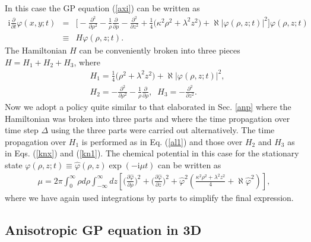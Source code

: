 \documentclass[onecolumn]{elsart3p}
\begin{document}
In this case the GP equation (\ref{axi}) can be written as
\begin{eqnarray}
\mbox{i}
\frac{\partial}{\partial t}\varphi(x,y;t) &  =&
\biggr[
-\frac{\partial^2}{\partial  \rho^2}
-\frac{1}{\rho}\frac{\partial}{\partial  \rho}
-\frac{\partial^2}{\partial  z^2}
+ \frac{1}{4} \biggr( \kappa^2\rho^2 + \lambda^2 z^2   \biggr)
+\aleph  %
|\varphi(\rho,z;t)|^2  \biggr]
\varphi(\rho,z;t) \nonumber \\ & \equiv & H \varphi(\rho,z;t).
\label{ax2}
\end{eqnarray}
The Hamiltonian $H$ can be conveniently broken
into three pieces $H=H_1+H_2+H_3$, where
\begin{align}
& H_1= \frac{1}{4} \biggr(  \rho^2 + \lambda^2 z^2   \biggr)
+\aleph  %
|\varphi(\rho,z;t)|^2,  \\
& H_2=-\frac{\partial^2}{\partial
\rho^2}-\frac{1}{\rho}\frac{\partial}{\partial  \rho}, \;\;
H_3=-\frac{\partial^2}{\partial z^2}. \;\;
\end{align}
Now we adopt a policy quite similar to that elaborated in Sec.
\ref{anp} where the Hamiltonian was broken into three parts and where
the
time propagation over time step $\Delta$ using the three parts were
carried out alternatively.
The time propagation over $H_1$ is performed as in Eq. (\ref{al1}) and
those over $H_2$ and $H_3$  as in Eqs. (\ref{knx}) and
(\ref{kn1}).
The chemical potential in this case for the stationary state
$\varphi(\rho,z;t)\equiv \hat \varphi(\rho,z)\exp(-\mbox{i}\mu t)$
can be
written as
\begin{align}
\mu = 2\pi
\int_{0}^\infty \rho d\rho \int_{-\infty}^\infty dz
 \left[ \biggr(\frac{{\partial}
\hat \varphi}{{\partial}\rho} 
\biggr)^2 +
\biggr(\frac{{\partial}\hat 
\varphi}{{\partial}z}
\biggr)^2
 + \hat \varphi^2 \left(
\frac{\kappa^2 \rho^2+\lambda^2 z^2}{4}+  \aleph %
{\hat 
\varphi^2}
\right)
\right] ,
\end{align}{
where we have again used integrations by parts to simplify the
final expression.}



\subsection{Anisotropic GP equation in 3D}
\end{document}

